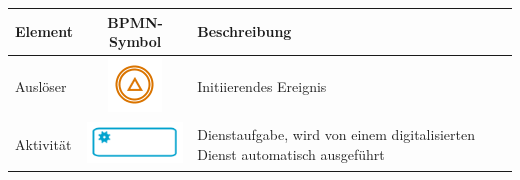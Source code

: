 \begin{table}[H]
	\centering
	\begin{tabularx}{\textwidth}{l c X} 
		\toprule
		\textbf{Element}  &  
		\textbf{BPMN-Symbol} &
		\textbf{Beschreibung}  \\ 
		\midrule
		
		Auslöser &   
		\begin{minipage}{.1\textwidth}
            \includegraphics[width=\linewidth]{img/startevent.png}
        \end{minipage}  &
		 Initiierendes Ereignis         \\  \cmidrule(r){1-1} \cmidrule(r){2-2} \cmidrule(r){3-3}
		
		Aktivität &   
		\begin{minipage}{.2\textwidth}
            \includegraphics[width=\linewidth]{img/service.png}
        \end{minipage}  &
		Dienstaufgabe, wird von einem digitalisierten Dienst automatisch ausgeführt \cite{OMG.2014}        \\   \cmidrule(r){2-2} \cmidrule(r){3-3}
		

\end{tabularx}
\end{table}
